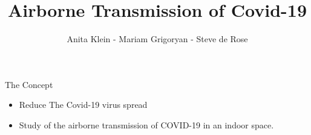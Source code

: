 \documentclass[10pt]{beamer}
\author{Anita Klein - Mariam Grigoryan - Steve de Rose}
\title{Airborne Transmission of Covid-19}
\newcommand{\PI}{}
\begin{document}
    
\begin{frame}

    \maketitle

\end{frame}


\section{\PI} 
\begin{frame}{The Concept}{\PI} 
    \begin{itemize}
        \item Reduce The Covid-19 virus spread
        \item Study of the airborne transmission of COVID-19 in an indoor space.
    \end{itemize}  

\end{frame}
\end{document}

